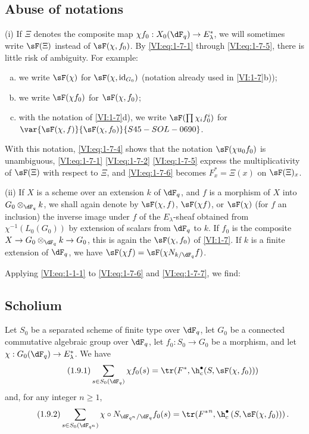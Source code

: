 \subsection{Abuse of notations}\label{VI:1-8}

(i) If $\Xi$ denotes the composite map 
$\chi f_0:X_0(\dF_q) \to E_\lambda^\ast$, we will sometimes write $\sF(\Xi)$ 
instead of $\sF(\chi,f_0)$. By \eqref{VI:eq:1-7-1} through \eqref{VI:eq:1-7-5}, 
there is little risk of ambiguity. For example:
\begin{enumerate}[a)]
  \item we write $\sF(\chi)$ for $\sF(\chi,\operatorname{id}_{G_0})$ 
    (notation already used in \ref{VI:1-7}b)); 
  \item we write $\sF(\chi f_0)$ for $\sF(\chi,f_0)$;
  \item with the notation of \ref{VI:1-7}d), we write 
    $\sF(\prod \chi_i f_0^i)$ for $\var{\sF(\chi,f)}{\sF(\chi,f_0)}{S45-SOL-0690}$. 
\end{enumerate}

With this notation, \eqref{VI:eq:1-7-4} shows that the notation 
$\sF(\chi u_0 f_0)$ is unambiguous, \eqref{VI:eq:1-7-1} \eqref{VI:eq:1-7-2} 
\eqref{VI:eq:1-7-5} express the multiplicativity of $\sF(\Xi)$ with respect to $\Xi$, 
and \eqref{VI:eq:1-7-6} becomes $F_x^\ast = \Xi(x)$ on $\sF(\Xi)_x$.

(ii) If $X$ is a scheme over an extension $k$ of $\dF_q$, and $f$ is a 
morphism of $X$ into $G_0\otimes_{\dF_q} k$, we shall again denote by $\sF(\chi,f)$, 
$\sF(\chi f)$, or $\sF(\chi)$ (for $f$ an inclusion) the inverse image under 
$f$ of the $E_\lambda$-sheaf obtained from $\chi^{-1}(L_0(G_0))$ by extension of 
scalars from $\dF_q$ to $k$. If $f_0$ is the composite 
$X\to G_0\otimes_{\dF_q} k \to G_0$, this is again the $\sF(\chi,f_0)$ of 
\ref{VI:1-7}. If $k$ is a finite extension of $\dF_q$, we have 
$\sF(\chi f) = \sF(\chi N_{k/\dF_q} f)$. 

Applying \eqref{VI:eq:1-1-1} to \eqref{VI:eq:1-7-6} and \eqref{VI:eq:1-7-7}, 
we find: 





\subsection{Scholium}\label{VI:1-9}
Let $S_0$ be a separated scheme of finite type over $\dF_q$, let $G_0$ be a 
connected commutative algebraic group over $\dF_q$, let $f_0:S_0\to G_0$ be a morphism, and let 
$\chi:G_0(\dF_q) \to E_\lambda^\ast$. We have 
\begin{equation*}\tag{1.9.1}\label{VI:eq:1-9-1}
  \sum_{s\in S_0(\dF_q)} \chi f_0(s) = \tr(F^\ast,\h_c^\bullet(S,\sF(\chi,f_0))) 
\end{equation*}
and, for any integer $n\geqslant 1$,
\begin{equation*}\tag{1.9.2}\label{VI:eq:1-9-2}
  \sum_{s\in S_0(\dF_{q^n})} \chi\circ N_{\dF_{q^n}/\dF_q} f_0(s) = \tr({F^\ast}^n, \h_c^\bullet\left(S,\sF(\chi,f_0))\right) \text{.}
\end{equation*}






